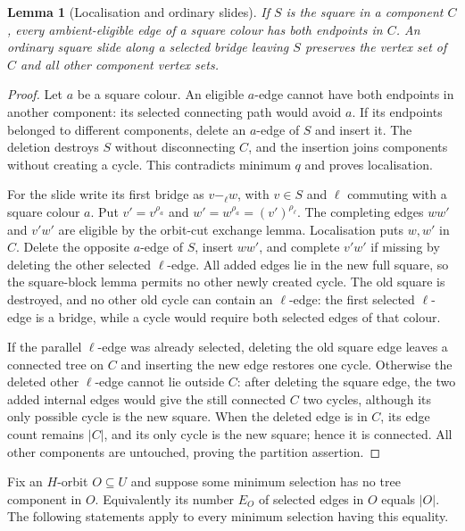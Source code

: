 \documentclass[11pt,a4paper]{article}
\newtheorem{lemma}{Lemma}
\begin{document}
\begin{lemma}[Localisation and ordinary slides]\label{local}
If $S$ is the square in a component $C$, every
ambient-eligible edge of a square colour has both endpoints
in $C$. An ordinary square slide along a selected bridge
leaving $S$ preserves the vertex set of $C$ and all other
component vertex sets.
\end{lemma}
\begin{proof}
Let $a$ be a square colour. An eligible $a$-edge cannot
have both endpoints in another component: its selected
connecting path would avoid $a$. If its endpoints belonged
to different components, delete an $a$-edge of $S$ and
insert it. The deletion destroys $S$ without disconnecting
$C$, and the insertion joins components without creating
a cycle. This contradicts minimum $q$ and proves localisation.

For the slide write its first bridge as
$v\mathrel{-_\ell}w$, with $v\in S$ and $\ell$ commuting
with a square colour $a$. Put $v'=v^{\rho_a}$ and
$w'=w^{\rho_a}=(v')^{\rho_\ell}$. The completing edges
$ww'$ and $v'w'$ are eligible by the orbit-cut exchange
lemma. Localisation puts $w,w'$ in $C$.
Delete the opposite $a$-edge of $S$, insert $ww'$, and
complete $v'w'$ if missing by deleting the other selected
$\ell$-edge. All added edges lie in the new full square,
so the square-block lemma permits no other newly created
cycle. The old square is destroyed, and no other old cycle
can contain an $\ell$-edge: the first selected $\ell$-edge
is a bridge, while a cycle would require both selected edges
of that colour.

If the parallel $\ell$-edge was already selected, deleting
the old square edge leaves a connected tree on $C$ and
inserting the new edge restores one cycle. Otherwise the
deleted other $\ell$-edge cannot lie outside $C$: after
deleting the square edge, the two added internal edges would
give the still connected $C$ two cycles, although its only
possible cycle is the new square. When the deleted edge is
in $C$, its edge count remains $|C|$, and its only cycle is
the new square; hence it is connected. All other components
are untouched, proving the partition assertion.
\end{proof}

Fix an $H$-orbit $O\subseteq U$ and suppose some minimum
selection has no tree component in $O$. Equivalently its
number $E_O$ of selected edges in $O$ equals $|O|$.
The following statements apply to every minimum selection
having this equality.
\end{document}
